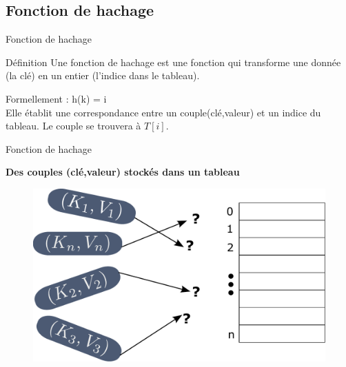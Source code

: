 \documentclass[12pt,a4paper]{beamer}
\newcommand{\hl}[1]{\textcolor{blueemph}{#1}}
\begin{document}
\subsection{Fonction de hachage}

\begin{frame}{Fonction de hachage}
\begin{block}{Définition}
Une fonction de hachage est une fonction qui transforme une donnée (la clé) en un entier (l'indice dans le tableau).
\end{block}
\hl{Formellement} : h(k) = i \\
\pause
Elle établit une correspondance entre un couple(clé,valeur) et un indice du tableau. Le couple se trouvera à $T[i]$.

\end{frame}

\begin{frame}{Fonction de hachage}

\centering \textbf{Des couples (clé,valeur) stockés dans un tableau}
\begin{block}{}
\begin{figure}
\includegraphics[scale=0.3]{figs/ht_global}
\end{figure}
\end{block}
\end{frame}
\end{document}

